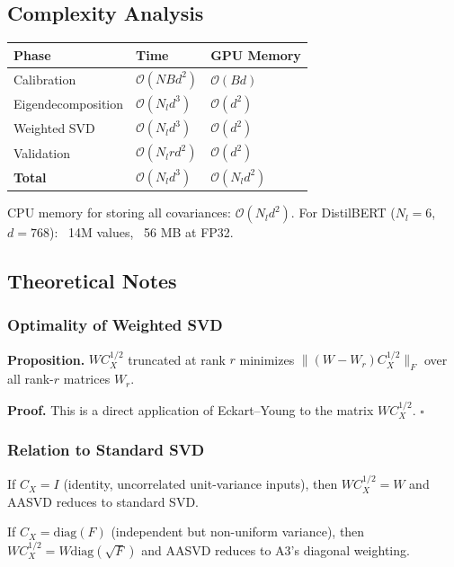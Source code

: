 \subsection{Complexity Analysis}

\begin{table}[H]
\centering
\small
\begin{tabular}{lll}
\toprule
\textbf{Phase} & \textbf{Time} & \textbf{GPU Memory} \\
\midrule
Calibration & $\mathcal{O}(N B d^2)$ & $\mathcal{O}(B d)$ \\
Eigendecomposition & $\mathcal{O}(N_l d^3)$ & $\mathcal{O}(d^2)$ \\
Weighted SVD & $\mathcal{O}(N_l d^3)$ & $\mathcal{O}(d^2)$ \\
Validation & $\mathcal{O}(N_l r d^2)$ & $\mathcal{O}(d^2)$ \\
\textbf{Total} & $\mathcal{O}(N_l d^3)$ & $\mathcal{O}(N_l d^2)$ \\
\bottomrule
\end{tabular}
\end{table}

CPU memory for storing all covariances: $\mathcal{O}(N_l d^2)$. For 
DistilBERT ($N_l = 6$, $d = 768$): ~14M values, ~56 MB at FP32.

\subsection{Theoretical Notes}

\subsubsection{Optimality of Weighted SVD}

\textbf{Proposition.} $W C_X^{1/2}$ truncated at rank $r$ minimizes $\|(W - W_r) C_X^{1/2}\|_F$ 
over all rank-$r$ matrices $W_r$.

\textbf{Proof.} This is a direct application of Eckart--Young to the matrix 
$W C_X^{1/2}$. $\square$

\subsubsection{Relation to Standard SVD}

If $C_X = I$ (identity, uncorrelated unit-variance inputs), then 
$W C_X^{1/2} = W$ and AASVD reduces to standard SVD.

If $C_X = \mathrm{diag}(F)$ (independent but non-uniform variance), then 
$W C_X^{1/2} = W \mathrm{diag}(\sqrt{F})$ and AASVD reduces to A3's 
diagonal weighting.

